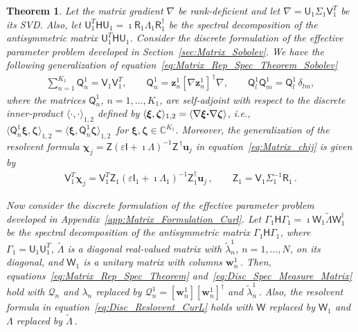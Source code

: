\documentclass[english,12pt,jmp,graphicx]{revtex4-1}
\newcommand{\vecw}{\boldsymbol{w}}
\newcommand{\vecu}{\boldsymbol{u}}
\newcommand{\vecxi}{\boldsymbol{\xi}}
\newcommand{\veczeta}{\boldsymbol{\zeta}}
\newcommand{\vecz}{\boldsymbol{z}}
\newcommand{\secref}[1]{Section~\ref{#1}}
\newcommand{\appref}[1]{Appendix~\ref{#1}}
\newcommand{\bcdot}{\mbox{\boldmath${\cdot}$}}
\newtheorem{theorem}{Theorem}
\newcommand{\vecchi}{\boldsymbol{\chi}}
\newcommand{\Hm}{\mathsf{H}}
\newcommand{\Um}{\mathsf{U}}
\newcommand{\Vm}{\mathsf{V}}
\newcommand{\Zm}{\mathsf{Z}}
\newcommand{\Qm}{\mathsf{Q}}
\newcommand{\Wm}{\mathsf{W}}
\newcommand{\Rm}{\mathsf{R}}
\newcommand{\Ib}{\mathsf{I}}
\newcommand{\Qc}{\mathcal{Q}}
\begin{document}
%
\begin{theorem}\label{thm:Spectral_Equivalence_Rank_Def}
%  
Let the matrix gradient $\nabla$ be rank-deficient and let
$\nabla=\Um_1\Sigma_1\Vm_1^T$ be its SVD.
Also, let $\Um_1^T\Hm\Um_1=\imath\Rm_1\Lambda_1\Rm_1^\dagger$
be the spectral decomposition of the antisymmetric matrix
$\Um_1^T\Hm\Um_1$.
Consider the discrete formulation of the effective parameter
problem developed in \secref{sec:Matrix_Sobolev}.
We have the following generalization of
equation~\eqref{eq:Matrix_Rep_Spec_Theorem_Sobolev} 
%
\begin{align}\label{eq:Matrix_Rep_Spec_Theorem_Sobolev_U1}
  \sum_{n=1}^{K_1}\Qm^1_n=\Vm_1\Vm_1^T, \qquad
  \Qm^1_n=\vecz^1_n[\nabla\vecz^1_n]^{\,\dagger}\nabla,  \qquad
  \Qm^1_l \Qm^1_m=\Qm^1_l\,\delta_{l m},
\end{align}
%
where the matrices $\Qm^1_n$, $n=1,\ldots,K_1$, are self-adjoint with
respect to the \emph{discrete} inner-product
$\langle\cdot,\cdot\rangle_{1,2}$ defined by
$\langle\vecxi,\veczeta\rangle_{1,2}
=\langle\nabla\vecxi\bcdot\nabla\veczeta\rangle$,
i.e., 
$\langle\Qm^1_n\vecxi,\veczeta\rangle_{1,2}
=\langle\vecxi,\Qm^1_n\veczeta\rangle_{1,2}\,$ for 
$\vecxi,\veczeta\in\mathbb{C}^{K_1}$.  
Moreover, the generalization of the resolvent formula
$\vecchi_j=\Zm(\varepsilon\Ib+\imath\Lambda)^{-1}\Zm^{\,\dagger}\vecu_j$ 
in equation~\eqref{eq:Matrix_chij}
is given by 
%
\begin{align}\label{eq:V1_chij}  
  \Vm_1^T\vecchi_j=
  \Vm_1^T\Zm_1(\varepsilon\Ib_1+\imath\Lambda_1)^{-1}\Zm_1^\dagger\vecu_j\,,
  \qquad
  \Zm_1=\Vm_1\Sigma_1^{-1}\Rm_1\,.
\end{align}
%





Now consider the discrete formulation of the effective parameter
problem developed in \appref{app:Matrix_Formulation_Curl}. Let
$\Gamma_1\Hm\Gamma_1=\imath\Wm_1\tilde{\Lambda}\Wm_1^\dagger$ be the
spectral decomposition of the antisymmetric matrix
$\Gamma_1\Hm\Gamma_1$, where $\Gamma_1=\Um_1\Um_1^T$,
$\tilde{\Lambda}$ is a diagonal real-valued matrix with
$\tilde{\lambda}_n^1$, $n=1,\ldots,N$, on its diagonal, and $\Wm_1$ is
a unitary matrix with columns $\vecw_n^1\,$. Then,
equations~\eqref{eq:Matrix_Rep_Spec_Theorem}
and~\eqref{eq:Disc_Spec_Measure_Matrix} hold with $\Qc_n$ and $\lambda_n$
replaced by $\Qc_n^1=[\vecw_n^1][\vecw_n^1]^\dagger$ and
$\tilde{\lambda}_n^1\,$. Also, the resolvent formula in
equation~\eqref{eq:Disc_Reslovent_CurL} holds with $\Wm$ replaced by
$\Wm_1$ and $\Lambda$ replaced by $\tilde{\Lambda}\,$. 



\end{theorem}
\end{document}
